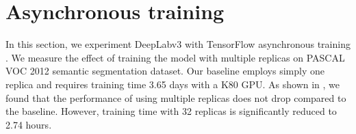 \begin{table}[!t]
  \centering
  \caption{Effect of batch size on PASCAL VOC 2012 \textit{val} set. We employ $\emph{output\_stride=16}$ during both training and evaluation. Large batch size is required while training the model with fine-tuning the batch normalization parameters.}
  \label{tab:batch_size}
\end{table}

\begin{table}[!t]
  \centering
  \caption{Effect of $\emph{output\_stride}$ on PASCAL VOC 2012 \textit{val} set. Employing $\emph{output\_stride=16}$ during training leads to better performance for both eval $\emph{output\_stride}=8$ and $16$.}
  \label{tab:output_stride}
\end{table}

\section{Asynchronous training}

In this section, we experiment DeepLabv3 with TensorFlow asynchronous training \cite{abadi2016tensorflow}. We measure the effect of training the model with multiple replicas on PASCAL VOC 2012 semantic segmentation dataset. Our baseline employs simply one replica and requires training time 3.65 days with a K80 GPU.
As shown in , we found that the performance of using multiple replicas does not drop compared to the baseline. However, training time with 32 replicas is significantly reduced to 2.74 hours.

